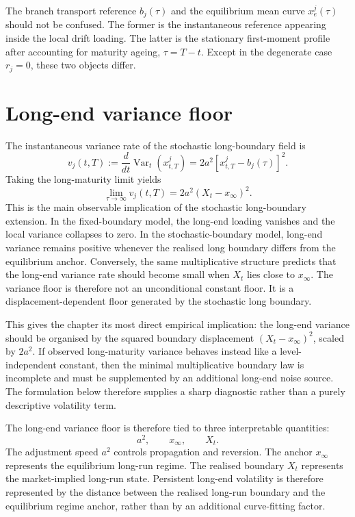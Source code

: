 \documentclass[11pt]{article}
\begin{document}
The branch transport reference \(b_j(\tau)\) and the equilibrium mean curve \(x^j_e(\tau)\) should not be confused. The former is the instantaneous reference appearing inside the local drift loading. The latter is the stationary first-moment profile after accounting for maturity ageing, \(\tau=T-t\). Except in the degenerate case \(r_j=0\), these two objects differ.

\section{Long-end variance floor}

The instantaneous variance rate of the stochastic long-boundary field is
\[
v_j(t,T)
:=
\frac{d}{dt}\operatorname{Var}_t(x^j_{t,T})
=
2a^2\left[x^j_{t,T}-b_j(\tau)\right]^2.
\]
Taking the long-maturity limit yields
\[
\lim_{\tau\to\infty}v_j(t,T)
=
2a^2(X_t-x_\infty)^2.
\]
This is the main observable implication of the stochastic long-boundary extension. In the fixed-boundary model, the long-end loading vanishes and the local variance collapses to zero. In the stochastic-boundary model, long-end variance remains positive whenever the realised long boundary differs from the equilibrium anchor. Conversely, the same multiplicative structure predicts that the long-end variance rate should become small when \(X_t\) lies close to \(x_\infty\). The variance floor is therefore not an unconditional constant floor. It is a displacement-dependent floor generated by the stochastic long boundary.

This gives the chapter its most direct empirical implication: the long-end variance should be organised by the squared boundary displacement \((X_t-x_\infty)^2\), scaled by \(2a^2\). If observed long-maturity variance behaves instead like a level-independent constant, then the minimal multiplicative boundary law is incomplete and must be supplemented by an additional long-end noise source. The formulation below therefore supplies a sharp diagnostic rather than a purely descriptive volatility term.

The long-end variance floor is therefore tied to three interpretable quantities:
\[
a^2,
\qquad
x_\infty,
\qquad
X_t.
\]
The adjustment speed \(a^2\) controls propagation and reversion. The anchor \(x_\infty\) represents the equilibrium long-run regime. The realised boundary \(X_t\) represents the market-implied long-run state. Persistent long-end volatility is therefore represented by the distance between the realised long-run boundary and the equilibrium regime anchor, rather than by an additional curve-fitting factor.
\end{document}
